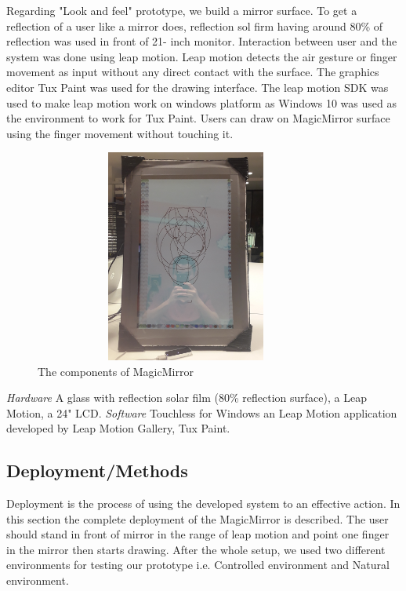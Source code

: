 \documentclass{sigchi-ext}
\begin{document}
Regarding "Look and feel" prototype, we build a mirror surface. To get a reflection of a user like a mirror does, reflection sol firm having around 80\% of reflection was used in front of 21- inch monitor. Interaction between user and the system was done using leap motion. Leap motion detects the air gesture or finger movement as input without any direct contact with the surface. The graphics editor Tux Paint was used for the drawing interface. The leap motion SDK was used to make leap motion work on windows platform as Windows 10 was used as the environment to work for Tux Paint. Users can draw on MagicMirror surface using the finger movement without touching it.
\begin{figure}[h]
\caption{The components of MagicMirror}
\centering
\includegraphics[width=10cm, height=7cm, angle=-90]{prototype}
\end{figure}
\linebreak
\textit{Hardware}
A glass with reflection solar film (80\% reflection surface), a Leap Motion, a 24" LCD.
\textit{Software}
Touchless for Windows an Leap Motion application developed by Leap Motion Gallery, Tux Paint.


\subsection{Deployment/Methods}
Deployment is the process of using the developed system to an effective action. In this section the complete deployment of the MagicMirror is described.
The user should stand in front of mirror in the range of leap motion and point one finger in the mirror then starts drawing.
After the whole setup, we used two different environments for testing our prototype i.e. Controlled environment and Natural environment.
\end{document}

